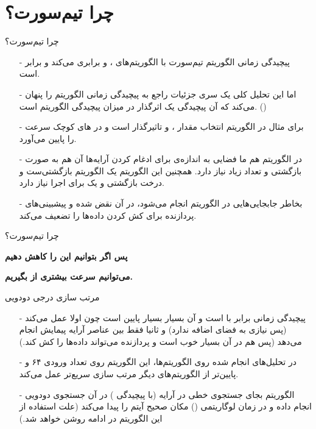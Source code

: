 \section{چرا تیم‌سورت؟}
\begin{frame}{چرا تیم‌سورت؟}
\begin{itemize}\itemr
\item[-]
پیچیدگی زمانی الگوریتم تیم‌سورت با الگوریتم‌های 
،
 و
برابری می‌کند و برابر 
است.

\item[-]
اما این تحلیل کلی یک سری جزئیات راجع به پیچیدگی زمانی الگوریتم را پنهان می‌کند که آن پیچیدگی یک 
اثرگذار در میزان پیچیدگی الگوریتم است. ()

\item[-]
برای مثال در الگوریتم  انتخاب مقدار 
،
 و
تاثیرگذار است و در های کوچک سرعت را پایین می‌آورد.

\item[-]
در الگوریتم 
هم ما فضایی به اندازه‌ی  برای ادغام کردن آرایه‌ها آن هم به صورت بازگشتی و تعداد زیاد نیاز دارد. همچنین این الگوریتم یک الگوریتم بازگشتی‌ست و درخت بازگشتی و یک  برای اجرا نیاز دارد.

\item[-]
بخاطر جابجایی‌هایی در الگوریتم  انجام می‌شود، 
در آن نقض شده و پیشبینی‌های پردازنده‌ برای کش کردن داده‌ها را تضعیف می‌کند.
\end{itemize}
\end{frame}

\begin{frame}{چرا تیم‌سورت؟}
\begin{center}
{\Large \textbf{پس اگر بتوانیم این  را کاهش دهیم}}

{\Large \textbf{می‌توانیم سرعت بیشتری از  بگیریم.}}
\end{center}
\end{frame}

\begin{frame}{مرتب سازی درجی دودویی}
\begin{itemize}\itemr
\item[-]
پیچیدگی زمانی  برابر با 
است و 
آن بسیار بسیار پایین است چون اولا  عمل می‌کند (پس نیازی به فضای اضافه ندارد) و ثانیا فقط بین عناصر آرایه پیمایش انجام می‌دهد (پس  هم در آن بسیار خوب است و پردازنده می‌تواند داده‌ها را کش کند.)

\item[-]
در تحلیل‌های انجام شده روی الگوریتم‌ها، این الگوریتم روی تعداد ورودی ۶۴ و پایین‌تر از الگوریتم‌های دیگر مرتب سازی سریع‌تر عمل می‌‌کند.

\item[-]
الگوریتم 
بجای جستجوی خطی در آرایه (با پیچیدگی ) در آن جستجوی دودویی انجام داده و در زمان لوگاریتمی () مکان صحیح آیتم را پیدا می‌‌کند (علت استفاده از این الگوریتم در ادامه روشن خواهد شد.)
\end{itemize}
\end{frame}

